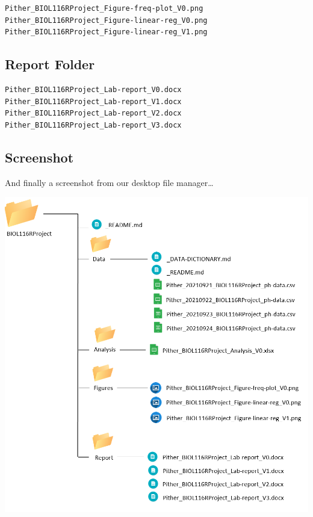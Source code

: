 \documentclass[
]{book}
\begin{document}
\begin{verbatim}
Pither_BIOL116RProject_Figure-freq-plot_V0.png
Pither_BIOL116RProject_Figure-linear-reg_V0.png
Pither_BIOL116RProject_Figure-linear-reg_V1.png
\end{verbatim}

\hypertarget{report-folder}{%
\subsection*{Report Folder}\label{report-folder}}

\begin{verbatim}
Pither_BIOL116RProject_Lab-report_V0.docx
Pither_BIOL116RProject_Lab-report_V1.docx
Pither_BIOL116RProject_Lab-report_V2.docx
Pither_BIOL116RProject_Lab-report_V3.docx
\end{verbatim}

\hypertarget{screenshot}{%
\subsection*{Screenshot}\label{screenshot}}

And finally a screenshot from our desktop file manager\ldots{}

\includegraphics{images/DS_biol116-directory-example.png}
\end{document}
